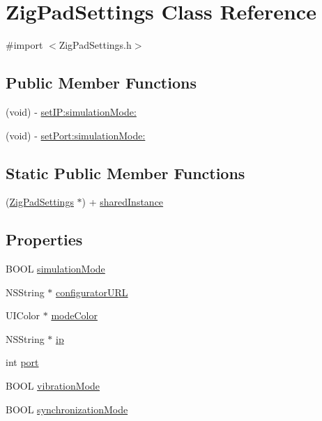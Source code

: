 \hypertarget{interface_zig_pad_settings}{
\section{ZigPadSettings Class Reference}
\label{interface_zig_pad_settings}
}


{\ttfamily \#import $<$ZigPadSettings.h$>$}

\subsection*{Public Member Functions}
\begin{DoxyCompactItemize}
\item 
(void) -\/ \hyperlink{interface_zig_pad_settings_a510ae0a55f24da67a68e8758252ccfda}{setIP:simulationMode:}
\item 
(void) -\/ \hyperlink{interface_zig_pad_settings_a35d36542dd82b12e24791819092906c5}{setPort:simulationMode:}
\end{DoxyCompactItemize}
\subsection*{Static Public Member Functions}
\begin{DoxyCompactItemize}
\item 
(\hyperlink{interface_zig_pad_settings}{ZigPadSettings} $\ast$) + \hyperlink{interface_zig_pad_settings_a62b9daa68893a19f9b6a6737fb8f875a}{sharedInstance}
\end{DoxyCompactItemize}
\subsection*{Properties}
\begin{DoxyCompactItemize}
\item 
BOOL \hyperlink{interface_zig_pad_settings_ab314ed8d97474bb5391236ced665bd3b}{simulationMode}
\item 
NSString $\ast$ \hyperlink{interface_zig_pad_settings_a3b2dbac08a4748cccf3aea0c3f557fd4}{configuratorURL}
\item 
UIColor $\ast$ \hyperlink{interface_zig_pad_settings_a22b7a43d44d562d77d8534e46db89fe1}{modeColor}
\item 
NSString $\ast$ \hyperlink{interface_zig_pad_settings_ad56edd22bf5c939f2931577a179b55ab}{ip}
\item 
int \hyperlink{interface_zig_pad_settings_a63c89c04d1feae07ca35558055155ffb}{port}
\item 
BOOL \hyperlink{interface_zig_pad_settings_a1c931b82b4ab31532ef34774f30cb6f1}{vibrationMode}
\item 
BOOL \hyperlink{interface_zig_pad_settings_a9fcf30f1031663343ce08b401c8d2a8c}{synchronizationMode}
\end{DoxyCompactItemize}


